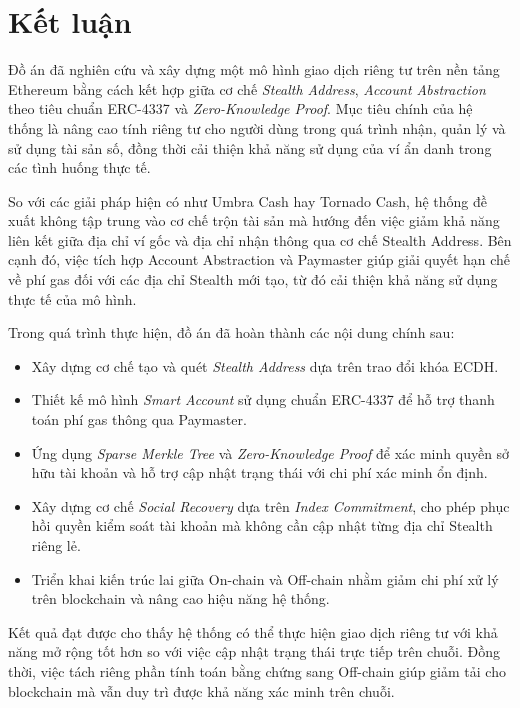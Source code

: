 \documentclass[../DoAn.tex]{subfiles}
\begin{document}
\section{Kết luận}

Đồ án đã nghiên cứu và xây dựng một mô hình giao dịch riêng tư trên nền tảng Ethereum bằng cách kết hợp giữa cơ chế \textit{Stealth Address}, \textit{Account Abstraction} theo tiêu chuẩn ERC-4337 và \textit{Zero-Knowledge Proof}. Mục tiêu chính của hệ thống là nâng cao tính riêng tư cho người dùng trong quá trình nhận, quản lý và sử dụng tài sản số, đồng thời cải thiện khả năng sử dụng của ví ẩn danh trong các tình huống thực tế.

So với các giải pháp hiện có như Umbra Cash hay Tornado Cash, hệ thống đề xuất không tập trung vào cơ chế trộn tài sản mà hướng đến việc giảm khả năng liên kết giữa địa chỉ ví gốc và địa chỉ nhận thông qua cơ chế Stealth Address. Bên cạnh đó, việc tích hợp Account Abstraction và Paymaster giúp giải quyết hạn chế về phí gas đối với các địa chỉ Stealth mới tạo, từ đó cải thiện khả năng sử dụng thực tế của mô hình.

Trong quá trình thực hiện, đồ án đã hoàn thành các nội dung chính sau:
\begin{itemize}
    \item Xây dựng cơ chế tạo và quét \textit{Stealth Address} dựa trên trao đổi khóa ECDH.
    \item Thiết kế mô hình \textit{Smart Account} sử dụng chuẩn ERC-4337 để hỗ trợ thanh toán phí gas thông qua Paymaster.
    \item Ứng dụng \textit{Sparse Merkle Tree} và \textit{Zero-Knowledge Proof} để xác minh quyền sở hữu tài khoản và hỗ trợ cập nhật trạng thái với chi phí xác minh ổn định.
    \item Xây dựng cơ chế \textit{Social Recovery} dựa trên \textit{Index Commitment}, cho phép phục hồi quyền kiểm soát tài khoản mà không cần cập nhật từng địa chỉ Stealth riêng lẻ.
    \item Triển khai kiến trúc lai giữa On-chain và Off-chain nhằm giảm chi phí xử lý trên blockchain và nâng cao hiệu năng hệ thống.
\end{itemize}

Kết quả đạt được cho thấy hệ thống có thể thực hiện giao dịch riêng tư với khả năng mở rộng tốt hơn so với việc cập nhật trạng thái trực tiếp trên chuỗi. Đồng thời, việc tách riêng phần tính toán bằng chứng sang Off-chain giúp giảm tải cho blockchain mà vẫn duy trì được khả năng xác minh trên chuỗi.
\end{document}
